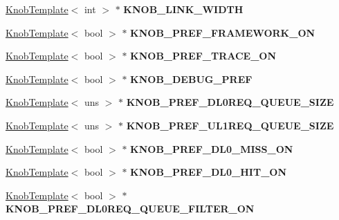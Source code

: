 \begin{DoxyCompactItemize}
\item 
\hypertarget{classall__knobs__c_acb5367ac9a9b55d4438173bee7c2caa8}{
\hyperlink{classKnobTemplate}{KnobTemplate}$<$ int $>$ $\ast$ {\bfseries KNOB\_\-LINK\_\-WIDTH}}
\label{classall__knobs__c_acb5367ac9a9b55d4438173bee7c2caa8}

\item 
\hypertarget{classall__knobs__c_aca78752107ecb37815f86aa4648e102a}{
\hyperlink{classKnobTemplate}{KnobTemplate}$<$ bool $>$ $\ast$ {\bfseries KNOB\_\-PREF\_\-FRAMEWORK\_\-ON}}
\label{classall__knobs__c_aca78752107ecb37815f86aa4648e102a}

\item 
\hypertarget{classall__knobs__c_a5be80f50700084437445f9a41f642172}{
\hyperlink{classKnobTemplate}{KnobTemplate}$<$ bool $>$ $\ast$ {\bfseries KNOB\_\-PREF\_\-TRACE\_\-ON}}
\label{classall__knobs__c_a5be80f50700084437445f9a41f642172}

\item 
\hypertarget{classall__knobs__c_a11025435dfd662f94156c38cdc909c6f}{
\hyperlink{classKnobTemplate}{KnobTemplate}$<$ bool $>$ $\ast$ {\bfseries KNOB\_\-DEBUG\_\-PREF}}
\label{classall__knobs__c_a11025435dfd662f94156c38cdc909c6f}

\item 
\hypertarget{classall__knobs__c_ab44e42c93549c3ad02b013cd78f6a78f}{
\hyperlink{classKnobTemplate}{KnobTemplate}$<$ uns $>$ $\ast$ {\bfseries KNOB\_\-PREF\_\-DL0REQ\_\-QUEUE\_\-SIZE}}
\label{classall__knobs__c_ab44e42c93549c3ad02b013cd78f6a78f}

\item 
\hypertarget{classall__knobs__c_a7375170d87a3aa6a0000af0ba92a480d}{
\hyperlink{classKnobTemplate}{KnobTemplate}$<$ uns $>$ $\ast$ {\bfseries KNOB\_\-PREF\_\-UL1REQ\_\-QUEUE\_\-SIZE}}
\label{classall__knobs__c_a7375170d87a3aa6a0000af0ba92a480d}

\item 
\hypertarget{classall__knobs__c_af2126b2ef2f33d57467ef0b39b2ed463}{
\hyperlink{classKnobTemplate}{KnobTemplate}$<$ bool $>$ $\ast$ {\bfseries KNOB\_\-PREF\_\-DL0\_\-MISS\_\-ON}}
\label{classall__knobs__c_af2126b2ef2f33d57467ef0b39b2ed463}

\item 
\hypertarget{classall__knobs__c_a48235004b3a1aaf9caa88f0855e430ec}{
\hyperlink{classKnobTemplate}{KnobTemplate}$<$ bool $>$ $\ast$ {\bfseries KNOB\_\-PREF\_\-DL0\_\-HIT\_\-ON}}
\label{classall__knobs__c_a48235004b3a1aaf9caa88f0855e430ec}

\item 
\hypertarget{classall__knobs__c_a3d09d6731a3e1c7d6419078be5295f0a}{
\hyperlink{classKnobTemplate}{KnobTemplate}$<$ bool $>$ $\ast$ {\bfseries KNOB\_\-PREF\_\-DL0REQ\_\-QUEUE\_\-FILTER\_\-ON}}
\label{classall__knobs__c_a3d09d6731a3e1c7d6419078be5295f0a}


\end{DoxyCompactItemize}
